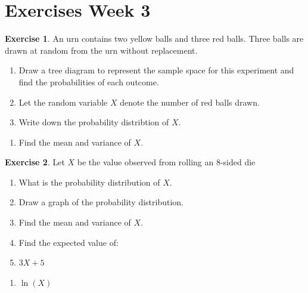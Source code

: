 \documentclass[
]{book}
\providecommand{\tightlist}{%
  \setlength{\itemsep}{0pt}\setlength{\parskip}{0pt}}
\theoremstyle{definition}
\theoremstyle{definition}
\theoremstyle{definition}
\newtheorem{exercise}{Exercise}[chapter]
\theoremstyle{definition}
\theoremstyle{remark}
\begin{document}
\hypertarget{exercises-week-3}{%
\section{Exercises Week 3}\label{exercises-week-3}}

\begin{exercise}

An urn contains two yellow balls and three red balls. Three balls are drawn at random from the urn without replacement.

\begin{enumerate}
\def\labelenumi{\alph{enumi})}
\item
  Draw a tree diagram to represent the sample space for this experiment and find the probabilities of each outcome.
\item
  Let the random variable \(X\) denote the number of red balls drawn.
\item
  Write down the probability distribtion of \(X\).
\end{enumerate}

\begin{enumerate}
\def\labelenumi{\roman{enumi})}
\setcounter{enumi}{1}
\tightlist
\item
  Find the mean and variance of \(X\).
\end{enumerate}

\end{exercise}

\begin{exercise}

Let \(X\) be the value observed from rolling an \(8\)-sided die

\begin{enumerate}
\def\labelenumi{\alph{enumi})}
\item
  What is the probability distribution of \(X\).
\item
  Draw a graph of the probability distribution.
\item
  Find the mean and variance of \(X\).
\item
  Find the expected value of:
\item
  \(3X+5\)
\end{enumerate}

\begin{enumerate}
\def\labelenumi{\roman{enumi})}
\setcounter{enumi}{1}
\tightlist
\item
  \(\ln(X)\)
\end{enumerate}

\end{exercise}
\end{document}
